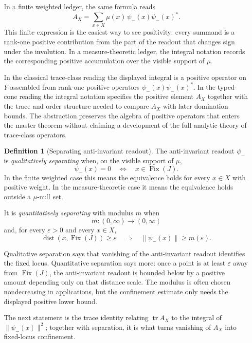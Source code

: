 \documentclass[11pt]{article}
\DeclareMathOperator{\Fix}{Fix}
\DeclareMathOperator{\dist}{dist}
\DeclareMathOperator{\trace}{tr}
\newcommand{\psim}{\psi_{-}}
\newcommand{\AX}{A_{X}}
\theoremstyle{definition}
\newtheorem{definition}[theorem]{Definition}
\begin{document}
In a finite weighted ledger, the same formula reads
\[
  \AX=\sum_{x\in X}\mu(x)\,\psim(x)\psim(x)^*.
\]
This finite expression is the easiest way to see positivity: every
summand is a rank-one positive contribution from the part of the
readout that changes sign under the involution.  In a
measure-theoretic ledger, the integral notation records the
corresponding positive accumulation over the visible support of
\(\mu\).

In the classical trace-class reading the displayed integral is a
positive operator on \(Y\) assembled from rank-one positive
operators \(\psim(x)\psim(x)^*\).  In the typed-cone reading the
integral notation specifies the positive element \(\AX\) together
with the trace and order structure needed to compare \(\AX\) with
later domination bounds.  The abstraction preserves the algebra of
positive operators that enters the master theorem without claiming a
development of the full analytic theory of trace-class operators.

\begin{definition}[Separating anti-invariant readout]
\label{def:duality_confinement:separating-readout}
The anti-invariant readout \(\psim\) is
\emph{qualitatively separating} when, on the visible support of
\(\mu\),
\[
  \psim(x)=0
  \quad\Longleftrightarrow\quad
  x\in\Fix(J).
\]
In the finite weighted case this means the equivalence holds for
every \(x\in X\) with positive weight.  In the measure-theoretic
case it means the equivalence holds outside a \(\mu\)-null set.

It is \emph{quantitatively separating} with modulus \(m\) when
\[
  m:(0,\infty)\to(0,\infty)
\]
and, for every \(\varepsilon>0\) and every \(x\in X\),
\[
  \dist(x,\Fix(J))\geq\varepsilon
  \quad\Longrightarrow\quad
  \|\psim(x)\|\geq m(\varepsilon).
\]
\end{definition}

Qualitative separation says that vanishing of the anti-invariant
readout identifies the fixed locus.  Quantitative separation says
more: once a point is at least \(\varepsilon\) away from
\(\Fix(J)\), the anti-invariant readout is bounded below by a
positive amount depending only on that distance scale.  The modulus
is often chosen nondecreasing in applications, but the confinement
estimate only needs the displayed positive lower bound.

The next statement is the trace identity relating \(\trace\AX\) to
the integral of \(\|\psim(x)\|^2\); together with separation, it is
what turns vanishing of \(\AX\) into fixed-locus confinement.
\end{document}
